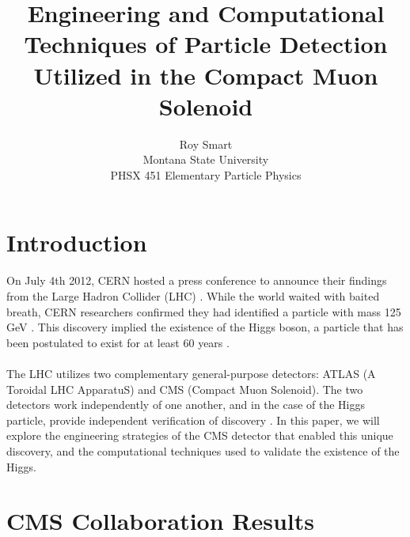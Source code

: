 \documentclass[12pt]{article}
\newcommand{\npar}{\\ \\ \noindent}
\begin{document}
\title{Engineering and Computational Techniques of Particle Detection Utilized in the Compact Muon Solenoid}
\author{Roy Smart \\ Montana State University \\PHSX 451 Elementary Particle Physics}
\maketitle

\section{Introduction}
On July 4th 2012, CERN hosted a press conference to announce their findings from the Large Hadron Collider (LHC) \cite{website:higgs_press}. While the world waited with baited breath, CERN researchers confirmed they had identified a particle with mass 125 GeV \cite{new_higgs}. This discovery implied the existence of the Higgs boson, a particle that has been postulated to exist for at least 60 years \cite{higgs_predict}. 
\npar
The LHC utilizes two complementary general-purpose detectors: ATLAS (A Toroidal LHC ApparatuS) and CMS (Compact Muon Solenoid). The two detectors work independently of one another, and in the case of the Higgs particle, provide independent verification of discovery \cite{lhc_combo}. In this paper, we will explore the engineering strategies of the CMS detector that enabled this unique discovery, and the computational techniques used to validate the existence of the Higgs.


\section{CMS Collaboration Results}
\end{document}
